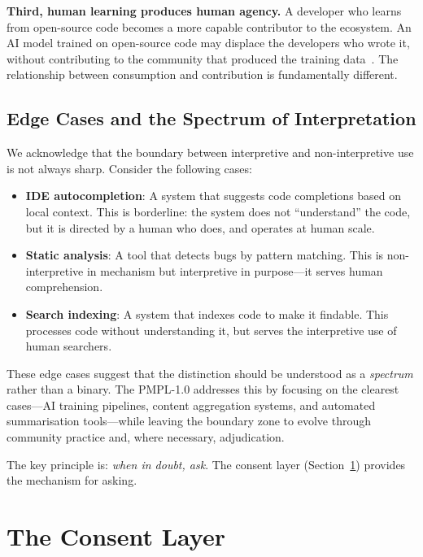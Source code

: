 \documentclass[11pt,twocolumn]{article}
\begin{document}
\textbf{Third, human learning produces human agency.} A developer who
learns from open-source code becomes a more capable contributor to the
ecosystem. An AI model trained on open-source code may displace the
developers who wrote it, without contributing to the community that
produced the training data~\cite{lemley2023generative}. The
relationship between consumption and contribution is fundamentally
different.

\subsection{Edge Cases and the Spectrum of Interpretation}

We acknowledge that the boundary between interpretive and
non-interpretive use is not always sharp. Consider the following cases:

\begin{itemize}
    \item \textbf{IDE autocompletion}: A system that suggests code
          completions based on local context. This is borderline:
          the system does not ``understand'' the code, but it is
          directed by a human who does, and operates at human scale.
    \item \textbf{Static analysis}: A tool that detects bugs by
          pattern matching. This is non-interpretive in mechanism
          but interpretive in purpose---it serves human comprehension.
    \item \textbf{Search indexing}: A system that indexes code to
          make it findable. This processes code without understanding
          it, but serves the interpretive use of human searchers.
\end{itemize}

These edge cases suggest that the distinction should be understood as a
\emph{spectrum} rather than a binary. The PMPL-1.0 addresses this by
focusing on the clearest cases---AI training pipelines, content
aggregation systems, and automated summarisation tools---while leaving
the boundary zone to evolve through community practice and, where
necessary, adjudication.

The key principle is: \emph{when in doubt, ask}. The consent layer
(Section~\ref{sec:consent-layer}) provides the mechanism for asking.

\section{The Consent Layer}
\label{sec:consent-layer}
\end{document}
